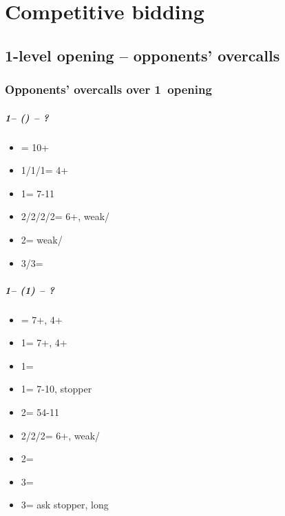 \documentclass[12pt, a4paper]{report}
\begin{document}
\part*{\colorbox{RoyalPurple!30}{Competitive bidding}}

\chapter*{\colorbox{Plum!30}{1-level opening -- opponents' overcalls}}

\section*{\colorbox{blue!30}{Opponents' overcalls over 1\clubs\ opening}}

\subsubsection*{1\clubs -- (\dbl) -- ?}
\begin{itemize}
    \item \rdbl = 10+
    \item 1\diams/1\hearts/1\spades = \trsf{\hearts/\spades/\nt} 4+
    \item 1\nt = 7-11
    \item 2\clubs/2\diams/2\hearts/2\spades = \trsf{\diams/\hearts/\spades/\clubs} 6+, weak/\gf
    \item 2\nt = \minor weak/\gf
    \item 3\clubs/3\diams = \inv
\end{itemize}

\subsubsection*{1\clubs -- (1\diams) -- ?}
\begin{itemize}
    \item \dbl = 7+, 4+\hearts
    \item 1\hearts = 7+, 4+\spades
    \item 1\spades = \nt
    \item 1\nt = 7-10, \diams stopper
    \item 2\clubs = 54-11
    \item 2\diams/2\hearts/2\spades = \trsf{\hearts/\spades/\clubs} 6+, weak/\gf
    \item 2\nt = \inv
    \item 3\clubs = \inv
    \item 3\diams = ask stopper, long \clubs
\end{itemize}
\end{document}
